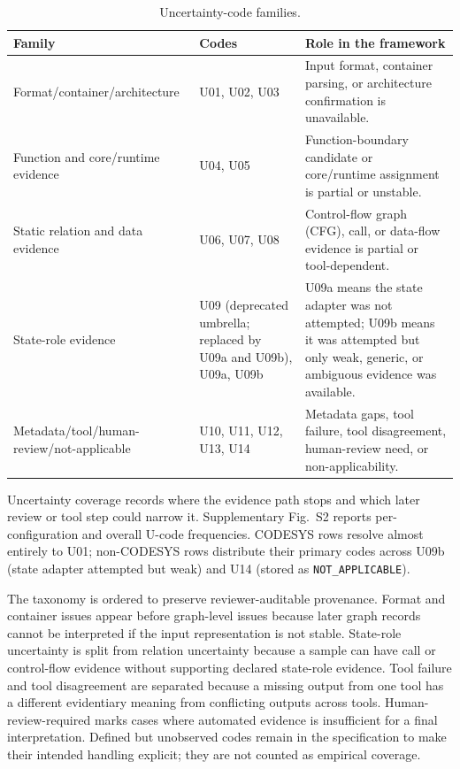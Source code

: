 \documentclass[manuscript,screen,review]{acmart}
\begin{document}
\begin{table}[t]
\centering
\small
\caption{Uncertainty-code families.}
\label{tab:s5_2}
\begin{tabularx}{\textwidth}{>{\raggedright\arraybackslash}X>{\raggedright\arraybackslash}X>{\raggedright\arraybackslash}X}
\toprule
Family & Codes & Role in the framework \\
\midrule
Format/container/architecture & U01, U02, U03 & Input format, container parsing, or architecture confirmation is unavailable. \\
Function and core/runtime evidence & U04, U05 & Function-boundary candidate or core/runtime assignment is partial or unstable. \\
Static relation and data evidence & U06, U07, U08 & Control-flow graph (CFG), call, or data-flow evidence is partial or tool-dependent. \\
State-role evidence & U09 (deprecated umbrella; replaced by U09a and U09b), U09a, U09b & U09a means the state adapter was not attempted; U09b means it was attempted but only weak, generic, or ambiguous evidence was available. \\
Metadata/tool/human-review/not-applicable & U10, U11, U12, U13, U14 & Metadata gaps, tool failure, tool disagreement, human-review need, or non-applicability. \\
\bottomrule
\end{tabularx}
\end{table}

Uncertainty coverage records where the evidence path stops and which later review or tool step could narrow it. Supplementary Fig.~S2 reports per-configuration and overall U-code frequencies. CODESYS rows resolve almost entirely to U01; non-CODESYS rows distribute their primary codes across U09b (state adapter attempted but weak) and U14 (stored as \texttt{NOT\_APPLICABLE}).

The taxonomy is ordered to preserve reviewer-auditable provenance. Format and container issues appear before graph-level issues because later graph records cannot be interpreted if the input representation is not stable. State-role uncertainty is split from relation uncertainty because a sample can have call or control-flow evidence without supporting declared state-role evidence. Tool failure and tool disagreement are separated because a missing output from one tool has a different evidentiary meaning from conflicting outputs across tools. Human-review-required marks cases where automated evidence is insufficient for a final interpretation. Defined but unobserved codes remain in the specification to make their intended handling explicit; they are not counted as empirical coverage.
\end{document}
